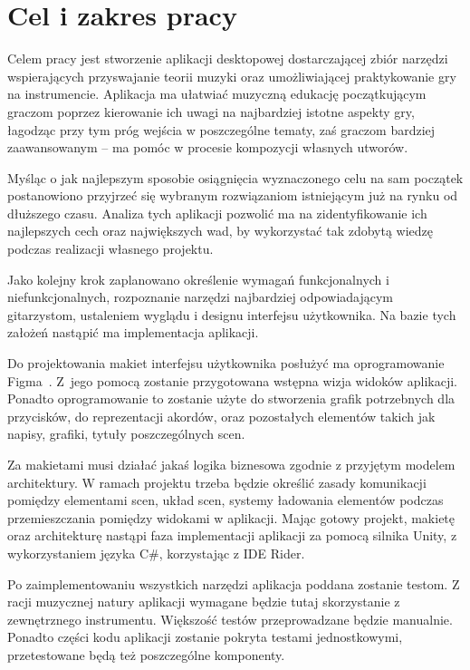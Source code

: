 \section{Cel i zakres pracy}
Celem pracy jest stworzenie aplikacji desktopowej dostarczającej zbiór narzędzi wspierających przyswajanie teorii muzyki oraz umożliwiającej praktykowanie gry na instrumencie. Aplikacja ma ułatwiać muzyczną edukację początkującym graczom poprzez kierowanie ich uwagi na najbardziej istotne aspekty gry, łagodząc przy tym próg wejścia w poszczególne tematy, zaś graczom bardziej zaawansowanym -- ma pomóc w procesie kompozycji własnych utworów. 

Myśląc o jak najlepszym sposobie osiągnięcia wyznaczonego celu na sam początek postanowiono przyjrzeć się wybranym rozwiązaniom istniejącym już na rynku od dłuższego czasu. Analiza tych aplikacji pozwolić ma na zidentyfikowanie ich najlepszych cech oraz największych wad, by wykorzystać tak zdobytą wiedzę podczas realizacji własnego projektu. 

Jako kolejny krok zaplanowano określenie wymagań funkcjonalnych i niefunkcjonalnych, rozpoznanie narzędzi najbardziej odpowiadającym gitarzystom, ustaleniem wyglądu i designu interfejsu użytkownika. Na bazie tych założeń nastąpić ma implementacja aplikacji.

Do projektowania makiet interfejsu użytkownika posłużyć ma oprogramowanie Figma~\cite{Figma}. Z~jego pomocą zostanie przygotowana wstępna wizja widoków aplikacji. Ponadto oprogramowanie to zostanie użyte do stworzenia grafik potrzebnych dla przycisków, do reprezentacji akordów, oraz pozostałych elementów takich jak napisy, grafiki, tytuły poszczególnych scen. 

Za makietami musi działać jakaś logika biznesowa zgodnie z przyjętym modelem architektury. W ramach projektu trzeba będzie określić zasady komunikacji pomiędzy elementami scen, układ scen, systemy ładowania elementów podczas przemieszczania pomiędzy widokami w aplikacji. Mając gotowy projekt, makietę oraz architekturę nastąpi faza implementacji aplikacji za pomocą silnika Unity, z wykorzystaniem języka C\#, korzystając z IDE Rider.

Po zaimplementowaniu wszystkich narzędzi aplikacja poddana zostanie testom. Z racji muzycznej natury aplikacji wymagane będzie tutaj skorzystanie z zewnętrznego instrumentu. Większość testów przeprowadzane będzie manualnie. Ponadto części kodu aplikacji zostanie pokryta testami jednostkowymi, przetestowane będą też poszczególne komponenty. 


